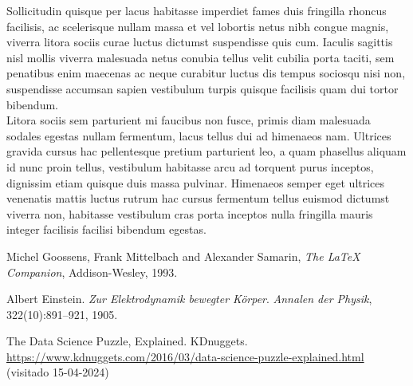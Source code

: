 \documentclass[12pt]{article}
\begin{document}
Sollicitudin quisque per lacus habitasse imperdiet fames duis fringilla rhoncus facilisis, ac scelerisque nullam massa et vel lobortis netus nibh congue magnis, viverra litora sociis curae luctus dictumst suspendisse quis cum. Iaculis sagittis nisl mollis viverra malesuada netus conubia tellus velit cubilia porta taciti, sem penatibus enim maecenas ac neque curabitur luctus dis tempus sociosqu nisi non, suspendisse accumsan sapien vestibulum turpis quisque facilisis quam dui tortor bibendum. \\

Litora sociis sem parturient mi faucibus non fusce, primis diam malesuada sodales egestas nullam fermentum, lacus tellus dui ad himenaeos nam. Ultrices gravida cursus hac pellentesque pretium parturient leo, a quam phasellus aliquam id nunc proin tellus, vestibulum habitasse arcu ad torquent purus inceptos, dignissim etiam quisque duis massa pulvinar. Himenaeos semper eget ultrices venenatis mattis luctus rutrum hac cursus fermentum tellus euismod dictumst viverra non, habitasse vestibulum cras porta inceptos nulla fringilla mauris integer facilisis facilisi bibendum egestas. 

\begin{figure}[h]
\end{figure}

\newpage
\begin{thebibliography}{a}

Michel Goossens, Frank Mittelbach and Alexander Samarin, \emph{The LaTeX Companion}, Addison-Wesley, 1993.

Albert Einstein. \emph{Zur Elektrodynamik bewegter K{\"o}rper}.
\emph{Annalen der Physik}, 322(10):891--921, 1905.

The Data Science Puzzle, Explained. KDnuggets. \\ \url{https://www.kdnuggets.com/2016/03/data-science-puzzle-explained.html} (visitado 15-04-2024)

\end{thebibliography}
\end{document}
